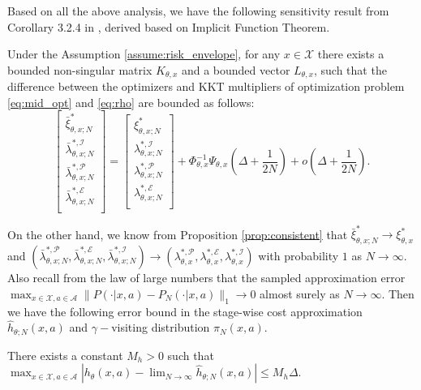 Based on all the above analysis, we have the following sensitivity result from Corollary 3.2.4 in \cite{fiacco1983introduction}, derived based on Implicit Function Theorem.
\begin{proposition}\label{prop:tech}
Under the Assumption \ref{assume:risk_envelope}, for any $x\in\mathcal X$ there exists a bounded non-singular matrix $K_{\theta,x}$ and a bounded vector $L_{\theta,x}$, such that the difference between the optimizers and KKT multipliers of optimization problem \eqref{eq:mid_opt} and \eqref{eq:rho} are bounded as follows:
\[
\begin{bmatrix}
\bar{\xi}^*_{\theta,x;N}\\
\bar{\lambda}^{*,\mathcal I}_{\theta,x;N}\\
\bar{\lambda}^{*,\mathcal P}_{\theta,x;N}\\
\bar{\lambda}^{*,\mathcal E}_{\theta,x;N}\\
\end{bmatrix}= \begin{bmatrix}
\xi^*_{\theta,x;N}\\
{\lambda}^{*,\mathcal I}_{\theta,x;N}\\
{\lambda}^{*,\mathcal P}_{\theta,x;N}\\
{\lambda}^{*,\mathcal E}_{\theta,x;N}\\
\end{bmatrix}+ \Phi_{\theta,x}^{-1}\Psi_{\theta,x}\left(\Delta+\frac{1}{2N}\right)+ o\left(\Delta+\frac{1}{2N}\right).
\]
\end{proposition}
On the other hand, we know from Proposition \ref{prop:consistent} that $\bar\xi^*_{\theta,x;N}\rightarrow \xi^*_{\theta,x}$ and $(\bar\lambda^{*,\mathcal P}_{\theta,x;N},\bar\lambda^{*,\mathcal E}_{\theta,x;N},\bar\lambda^{*,\mathcal I}_{\theta,x;N})\rightarrow(\lambda^{*,\mathcal P}_{\theta,x},\lambda^{*,\mathcal E}_{\theta,x},\lambda^{*,\mathcal I}_{\theta,x})$ with probability $1$ as $N\rightarrow\infty$.  Also recall from the law of large numbers that the sampled approximation error $\max_{x\in\mathcal X,a\in\mathcal A}\|P(\cdot|x,a)-P_N(\cdot|x,a)\|_1\rightarrow 0$ almost surely as $N\rightarrow \infty$. Then we have the following error bound in the stage-wise cost approximation $\widehat{h}_{\theta;N}(x,a)$ and $\gamma-$visiting distribution $\pi_N(x,a)$.
\begin{lemma}\label{lem:tech_2}
There exists a constant $M_h>0$ such that
$
\max_{x\in\mathcal X,a\in\mathcal A}|{h}_\theta(x,a)-\lim_{N\rightarrow\infty}\widehat{h}_{\theta;N}(x,a)|\leq M_h\Delta.
$
\end{lemma}
